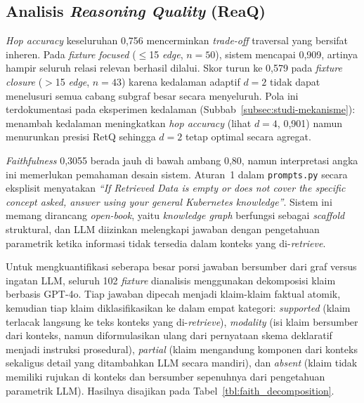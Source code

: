 \subsection{Analisis \textit{Reasoning Quality} (ReaQ)}
\label{subsec:analisis-reaq}

\textit{Hop accuracy} keseluruhan 0,756 mencerminkan \textit{trade-off} traversal yang bersifat inheren. Pada \textit{fixture} \textit{focused} ($\leq$15 \textit{edge}, $n{=}50$), sistem mencapai 0,909, artinya hampir seluruh relasi relevan berhasil dilalui. Skor turun ke 0,579 pada \textit{fixture} \textit{closure} ($>$15 \textit{edge}, $n{=}43$) karena kedalaman adaptif $d{=}2$ tidak dapat menelusuri semua cabang subgraf besar secara menyeluruh. Pola ini terdokumentasi pada eksperimen kedalaman (Subbab~\ref{subsec:studi-mekanisme}): menambah kedalaman meningkatkan \textit{hop accuracy} (lihat $d{=}4$, 0,901) namun menurunkan presisi RetQ sehingga $d{=}2$ tetap optimal secara agregat.

\textit{Faithfulness} 0,3055 berada jauh di bawah ambang 0,80, namun interpretasi angka ini memerlukan pemahaman desain sistem. Aturan~1 dalam \texttt{prompts.py} secara eksplisit menyatakan \textit{``If Retrieved Data is empty or does not cover the specific concept asked, answer using your general Kubernetes knowledge''}. Sistem ini memang dirancang \textit{open-book}, yaitu \textit{knowledge graph} berfungsi sebagai \textit{scaffold} struktural, dan LLM diizinkan melengkapi jawaban dengan pengetahuan parametrik ketika informasi tidak tersedia dalam konteks yang di-\textit{retrieve}.

Untuk mengkuantifikasi seberapa besar porsi jawaban bersumber dari graf versus ingatan LLM, seluruh 102 \textit{fixture} dianalisis menggunakan dekomposisi klaim berbasis GPT-4o. Tiap jawaban dipecah menjadi klaim-klaim faktual atomik, kemudian tiap klaim diklasifikasikan ke dalam empat kategori: \textit{supported} (klaim terlacak langsung ke teks konteks yang di-\textit{retrieve}), \textit{modality} (isi klaim bersumber dari konteks, namun diformulasikan ulang dari pernyataan skema deklaratif menjadi instruksi prosedural), \textit{partial} (klaim mengandung komponen dari konteks sekaligus detail yang ditambahkan LLM secara mandiri), dan \textit{absent} (klaim tidak memiliki rujukan di konteks dan bersumber sepenuhnya dari pengetahuan parametrik LLM). Hasilnya disajikan pada Tabel~\ref{tbl:faith_decomposition}.

